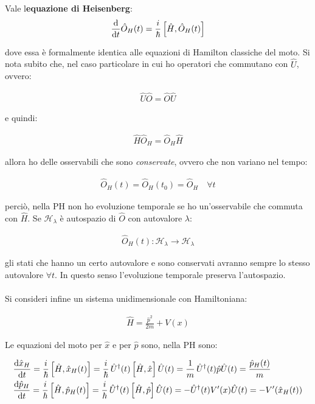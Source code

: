\begin{nb}
	Vale l\textbf{equazione di Heisenberg}:
\begin{align*}
	\dv{t}\hat{O}_H(t) = \frac{i}{\hbar} \, \qty[\hat{H}, \hat{O}_H(t)]
\end{align*}
\end{nb}

	dove essa è formalmente identica alle equazioni di Hamilton classiche del moto. Si nota subito che, nel caso particolare in cui ho operatori che commutano con $\hat{U}$, ovvero:
	
\begin{align*}
	\hat{U}\hat{O} = \hat{O}\hat{U}
\end{align*}

	e quindi:
	
\begin{align*}
	\hat{H}\hat{O}_H = \hat{O}_H\hat{H}
\end{align*}

	allora ho delle osservabili che sono \textit{conservate}, ovvero che non variano nel tempo:
	
\begin{align*}
	\hat{O}_H(t)= \hat{O}_H(t_0) = \hat{O}_H \quad \forall t
\end{align*}

	perciò, nella PH non ho evoluzione temporale se ho un'osservabile che commuta con $\hat{H}$. Se $\mathcal{H}_{\lambda}$ è autospazio di $\hat{O}$ con autovalore $\lambda$:

\begin{align*}
	\hat{O}_H(t) : \mathcal{H}_{\lambda} \to \mathcal{H}_{\lambda}
\end{align*}

	gli stati che hanno un certo autovalore e sono conservati avranno sempre lo stesso autovalore $\forall t$. In questo senso l'evoluzione temporale preserva l'autospazio.
	\\
	\\
	Si consideri infine un sistema unidimensionale con Hamiltoniana:
	
\begin{align*}
	\hat{H} = \frac{\hat{p}^2}{2m} + V(x)
\end{align*}

	Le equazioni del moto per $\hat{x}$ e per $\hat{p}$ sono, nella PH sono:

\begin{align*}
	& \dv{\hat{x}_H}{t} = \frac{i}{\hbar} \, \qty[ \hat{H}, \hat{x}_H(t) ] = \frac{i}{\hbar} \, \hat{U}^{\dagger}(t) \, \qty[\hat{H}, \hat{x}] \, \hat{U}(t) = \frac{1}{m} \, \hat{U}^{\dagger}(t) \hat{p}\hat{U}(t) = \frac{\hat{p}_H(t)}{m} \\
	& \dv{\hat{p}_H}{t} = \frac{i}{\hbar} \, \qty[ \hat{H}, \hat{p}_H(t) ] = \frac{i}{\hbar} \, \hat{U}^{\dagger}(t) \, \qty[\hat{H}, \hat{p}] \, \hat{U}(t) = - \hat{U}^{\dagger}(t)V'(x)\hat{U}(t) = -V'(\hat{x}_H(t))
\end{align*}

